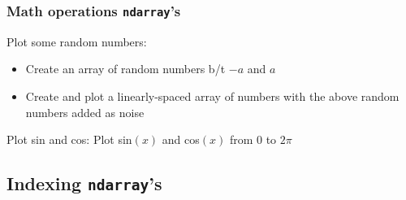 \documentclass{beamer}
\newcommand{\code}[1]{\texttt{#1}}
\begin{document}
\begin{frame}	
	\frametitle{Math operations \code{ndarray}'s}
	
	\begin{exampleblock}{Plot some random numbers:}
		\begin{itemize}
			\item Create an array of random numbers b/t $-a$ and $a$
			\item Create and plot a linearly-spaced array of numbers with the above random numbers added as noise
		\end{itemize}
	\end{exampleblock}
	
	\begin{exampleblock}{Plot sin and cos:}
		Plot sin$(x)$ and cos$(x)$ from 0 to $2\pi$
	\end{exampleblock}
	
\end{frame}


\subsection{Indexing \code{ndarray}'s}
\end{document}
